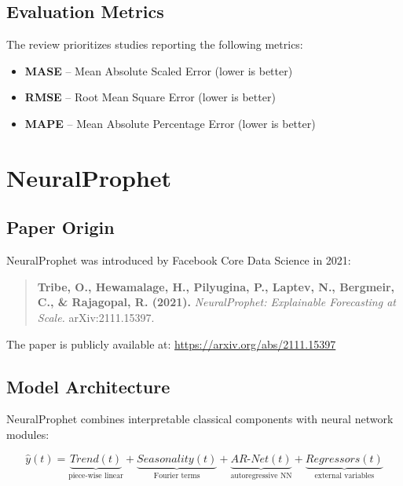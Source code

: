 \documentclass[12pt,a4paper]{article}
\begin{document}
\subsection{Evaluation Metrics}

The review prioritizes studies reporting the following metrics:
\begin{itemize}
    \item \textbf{MASE} -- Mean Absolute Scaled Error (lower is better)
    \item \textbf{RMSE} -- Root Mean Square Error (lower is better)
    \item \textbf{MAPE} -- Mean Absolute Percentage Error (lower is better)
\end{itemize}


\section{NeuralProphet}

\subsection{Paper Origin}

NeuralProphet was introduced by Facebook Core Data Science in 2021:

\begin{quote}
\textbf{Tribe, O., Hewamalage, H., Pilyugina, P., Laptev, N., Bergmeir, C., \& Rajagopal, R. (2021).} \textit{NeuralProphet: Explainable Forecasting at Scale.} arXiv:2111.15397.
\end{quote}

The paper is publicly available at: \url{https://arxiv.org/abs/2111.15397}

\subsection{Model Architecture}

NeuralProphet combines interpretable classical components with neural network modules:

\begin{equation}
\hat{y}(t) = \underbrace{Trend(t)}_{\text{piece-wise linear}} + \underbrace{Seasonality(t)}_{\text{Fourier terms}} + \underbrace{AR\text{-}Net(t)}_{\text{autoregressive NN}} + \underbrace{Regressors(t)}_{\text{external variables}}
\end{equation}
\end{document}
